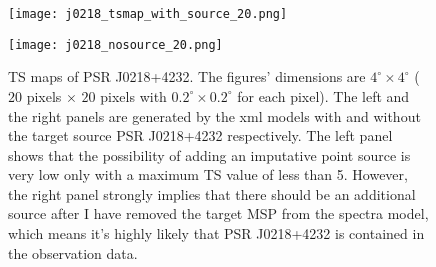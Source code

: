 \documentclass[a4paper, 12pt]{report}
\newcommand{\singleFig}[3]{
  \begin{figure}[!htp]
    \centering
    \texttt{[image: \#1]}
    \caption{#3}
    \label{fig: #1}
  \end{figure}
}
\begin{document}
      \vspace{1cm}
      \begin{figure}[!htp]
        \begin{center}
        \begin{minipage}{0.46\textwidth}
          \begin{center} 
            \texttt{[image: j0218\_tsmap\_with\_source\_20.png]}
          \end{center}
        \end{minipage}
        \begin{minipage}{0.45\textwidth}
          \begin{center}
            \texttt{[image: j0218\_nosource\_20.png]}
          \end{center}
        \end{minipage}
      \end{center}
      \caption[TS maps of PSR J0218+4232.]
        {TS maps of PSR J0218+4232. The figures' dimensions are 
        $4^{\circ} \times 4^{\circ}$ ($20$ pixels $\times$ $20$ pixels with 
        $0.2^{\circ} \times 0.2^{\circ}$ for each pixel). The left and the right panels are 
        generated by the xml models with and without the target source PSR J0218+4232 respectively.
        The left panel shows that the possibility of adding an imputative point source is very low 
        only with a maximum TS value of less than 5. However, the right panel strongly implies that 
        there should be an additional source after I have removed the target MSP from the spectra 
        model, which means it's highly likely that PSR J0218+4232 is contained in the observation 
        data.}
      \label{fig: j0218_tsmap_comparison_20}
      \end{figure}
\end{document}
